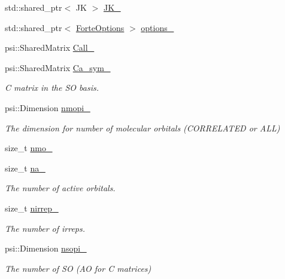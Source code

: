 \begin{DoxyCompactItemize}
\item 
std\+::shared\+\_\+ptr$<$ JK $>$ \mbox{\hyperlink{classforte_1_1_orbital_optimizer_a7330289491630846933d424e60e718d7}{J\+K\+\_\+}}
\item 
std\+::shared\+\_\+ptr$<$ \mbox{\hyperlink{classforte_1_1_forte_options}{Forte\+Options}} $>$ \mbox{\hyperlink{classforte_1_1_orbital_optimizer_ae426c8d5fe9b5942c4a0dc6573fe3c2c}{options\+\_\+}}
\item 
psi\+::\+Shared\+Matrix \mbox{\hyperlink{classforte_1_1_orbital_optimizer_addd44581df4959715d650fce7e142547}{Call\+\_\+}}
\item 
psi\+::\+Shared\+Matrix \mbox{\hyperlink{classforte_1_1_orbital_optimizer_a849bfb63a27b0e75adbf67da8b74d04e}{Ca\+\_\+sym\+\_\+}}
\begin{DoxyCompactList}\small\item\em C matrix in the SO basis. \end{DoxyCompactList}\item 
psi\+::\+Dimension \mbox{\hyperlink{classforte_1_1_orbital_optimizer_a2439f35f33a87f6432b3fd65ee6eadaf}{nmopi\+\_\+}}
\begin{DoxyCompactList}\small\item\em The dimension for number of molecular orbitals (C\+O\+R\+R\+E\+L\+A\+T\+ED or A\+LL) \end{DoxyCompactList}\item 
size\+\_\+t \mbox{\hyperlink{classforte_1_1_orbital_optimizer_a238376ec9831d97b133d4ea57219b21b}{nmo\+\_\+}}
\item 
size\+\_\+t \mbox{\hyperlink{classforte_1_1_orbital_optimizer_ae6ec0e06528c96c505b877ba139e2091}{na\+\_\+}}
\begin{DoxyCompactList}\small\item\em The number of active orbitals. \end{DoxyCompactList}\item 
size\+\_\+t \mbox{\hyperlink{classforte_1_1_orbital_optimizer_a9e0f51314c4e208ae3c09a023209494b}{nirrep\+\_\+}}
\begin{DoxyCompactList}\small\item\em The number of irreps. \end{DoxyCompactList}\item 
psi\+::\+Dimension \mbox{\hyperlink{classforte_1_1_orbital_optimizer_a9eecd789fe5954676698a177d773babd}{nsopi\+\_\+}}
\begin{DoxyCompactList}\small\item\em The number of SO (AO for C matrices) \end{DoxyCompactList}\item 

\end{DoxyCompactItemize}

